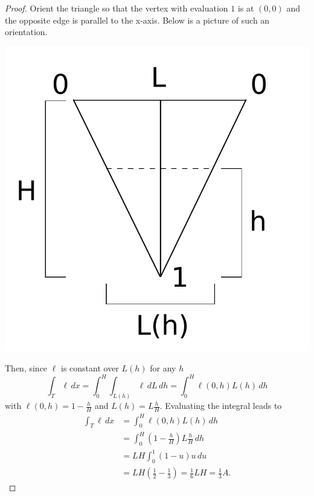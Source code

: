\documentclass[12pt,letterpaper]{article}
\begin{document}
\begin{proof}
Orient the triangle so that the vertex with evaluation $1$ is at $(0,0)$ and the opposite edge is parallel to the x-axis.
Below is a picture of such an orientation.
\begin{center}
\includegraphics[scale=0.4]{triangle1.pdf}
\end{center}
Then, since $\ell$ is constant over $L(h)$ for any $h$
\begin{equation}
\int_T \ell \, dx = \int_0^H \int_{L(h)} \ell \, dL \, dh = \int_0^H \ell(0,h) L(h) \, dh
\end{equation}
with $\ell(0,h) = 1 - \frac{h}{H}$ and $L(h) = L \frac{h}{H}$.
Evaluating the integral leads to
\begin{align*}
\int_T \ell \, dx &= \int_0^H \ell(0,h) L(h) \, dh \\
&= \int_0^H \left(1 - \frac{h}{H} \right) L \frac{h}{H} \, dh \\
&= L H \int_0^1 (1 - u) u \, du \\
&= L H \left( \frac{1}{2} - \frac{1}{3} \right) = \frac{1}{6} L H = \frac{1}{3} A.
\end{align*}
\end{proof}
\end{document}
